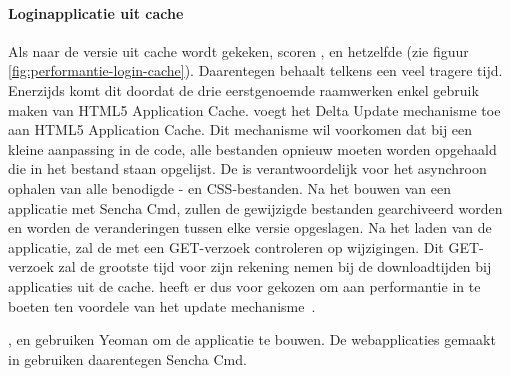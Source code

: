 \begin{table}
\centering
{}
\caption{Groottes.}
\label{tabel:evaluatie-performantie-groottes}
\end{table}


\paragraph{Loginapplicatie uit cache}
Als naar de versie uit cache wordt gekeken, scoren \kendo{}, \jqm{} en \lungo{} hetzelfde (zie figuur \ref{fig:performantie-login-cache}).
Daarentegen behaalt \st{} telkens een veel tragere tijd.
Enerzijds komt dit doordat de drie eerstgenoemde raamwerken enkel gebruik maken van HTML5 Application Cache.
\st{} voegt het Delta Update mechanisme toe aan HTML5 Application Cache.
Dit mechanisme wil voorkomen dat bij een kleine aanpassing in de code,  alle bestanden opnieuw moeten worden opgehaald die in het  bestand staan opgelijst.
De  is verantwoordelijk voor het asynchroon ophalen van alle benodigde \js{}- en CSS-bestanden.
Na het bouwen van een applicatie met Sencha Cmd,  zullen de gewijzigde bestanden gearchiveerd worden en worden de veranderingen tussen elke versie opgeslagen.
Na het laden van de applicatie, zal de  met een GET-verzoek controleren op wijzigingen.
Dit GET-verzoek zal de grootste tijd voor zijn rekening nemen bij de downloadtijden bij applicaties uit de cache.
\st{} heeft er dus voor gekozen om aan performantie in te boeten ten voordele van het update mechanisme~\cite{Nguyen2012}.

\kendo{}, \jqm{} en \lungo{} gebruiken Yeoman om de applicatie te bouwen.
De webapplicaties gemaakt in \st{} gebruiken daarentegen Sencha Cmd.


